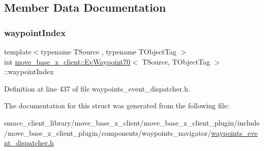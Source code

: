 \subsection{Member Data Documentation}
\mbox{\label{structmove__base__z__client_1_1EvWaypoint70_a6a6bda02c61be16b97d69eceff0caef7}} 
\subsubsection{\texorpdfstring{waypoint\+Index}{waypointIndex}}
{\footnotesize\ttfamily template$<$typename T\+Source , typename T\+Object\+Tag $>$ \\
int \hyperlink{structmove__base__z__client_1_1EvWaypoint70}{move\+\_\+base\+\_\+z\+\_\+client\+::\+Ev\+Waypoint70}$<$ T\+Source, T\+Object\+Tag $>$\+::waypoint\+Index}



Definition at line 437 of file waypoints\+\_\+event\+\_\+dispatcher.\+h.



The documentation for this struct was generated from the following file\+:\begin{DoxyCompactItemize}
\item 
smacc\+\_\+client\+\_\+library/move\+\_\+base\+\_\+z\+\_\+client/move\+\_\+base\+\_\+z\+\_\+client\+\_\+plugin/include/move\+\_\+base\+\_\+z\+\_\+client\+\_\+plugin/components/waypoints\+\_\+navigator/\hyperlink{waypoints__event__dispatcher_8h}{waypoints\+\_\+event\+\_\+dispatcher.\+h}\end{DoxyCompactItemize}
